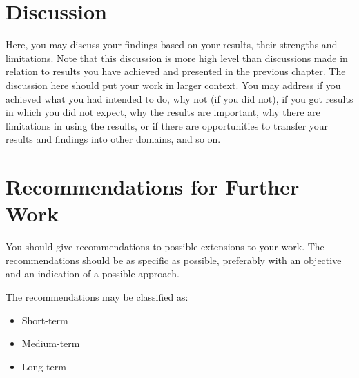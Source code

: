 \documentclass[thesis.tex]{subfiles}
\begin{document}
	\section{Discussion}
	\label{sec:discussion}
	Here, you may discuss your findings based on your results, their strengths and limitations. 
	Note that this discussion is more high level than discussions made in relation to results you have achieved and presented in the previous chapter. 
	The discussion here should put your work in larger context. 
	You may address if you achieved what you had intended to do, why not (if you did not), if you got results in which you did not expect, why the results are important, why there are limitations in using the results, or if there are opportunities to transfer your results and findings into other domains, and so on.
	\section{Recommendations for Further Work}
	\label{sec:recommendations_for_further_work}
	You should give recommendations to possible extensions to your work. 
	The recommendations should be as specific as possible, preferably with an objective and an indication of a possible approach.
	
	The recommendations may be classified as:
	\begin{itemize}
		\item Short-term
		\item Medium-term
		\item Long-term
	\end{itemize}
	
\end{document}
